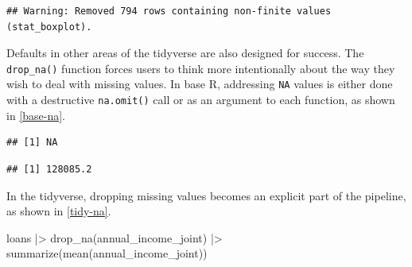 \documentclass[12pt]{article}
\newenvironment{Shaded}{\begin{snugshade}}{\end{snugshade}}
\newcommand{\AttributeTok}[1]{\textcolor[rgb]{0.77,0.63,0.00}{#1}}
\newcommand{\ConstantTok}[1]{\textcolor[rgb]{0.00,0.00,0.00}{#1}}
\newcommand{\FunctionTok}[1]{\textcolor[rgb]{0.00,0.00,0.00}{#1}}
\newcommand{\NormalTok}[1]{#1}
\newcommand{\SpecialCharTok}[1]{\textcolor[rgb]{0.00,0.00,0.00}{#1}}
\begin{document}
\begin{verbatim}
## Warning: Removed 794 rows containing non-finite values (stat_boxplot).
\end{verbatim}


\label{ggplot-warn} \linespread{2}
\vspace{3mm}\setlength{\parindent}{15pt}

Defaults in other areas of the tidyverse are also designed for success.
The \texttt{drop\_na()} function forces users to think more
intentionally about the way they wish to deal with missing values. In
base R, addressing \texttt{NA} values is either done with a destructive
\texttt{na.omit()} call or as an argument to each function, as shown in
\ref{base-na}.

\linespread{1}

\begin{Shaded}
\end{Shaded}

\begin{verbatim}
## [1] NA
\end{verbatim}

\begin{Shaded}
\end{Shaded}

\begin{verbatim}
## [1] 128085.2
\end{verbatim}


\label{base-na} \linespread{2} \vspace{3mm}\setlength{\parindent}{15pt}

In the tidyverse, dropping missing values becomes an explicit part of
the pipeline, as shown in \ref{tidy-na}.

\linespread{1}

\begin{Shaded}
\begin{Highlighting}[]
\NormalTok{loans }\SpecialCharTok{|\textgreater{}}
  \FunctionTok{drop\_na}\NormalTok{(annual\_income\_joint) }\SpecialCharTok{|\textgreater{}}
  \FunctionTok{summarize}\NormalTok{(}\FunctionTok{mean}\NormalTok{(annual\_income\_joint))}
\end{Highlighting}
\end{Shaded}
\end{document}
